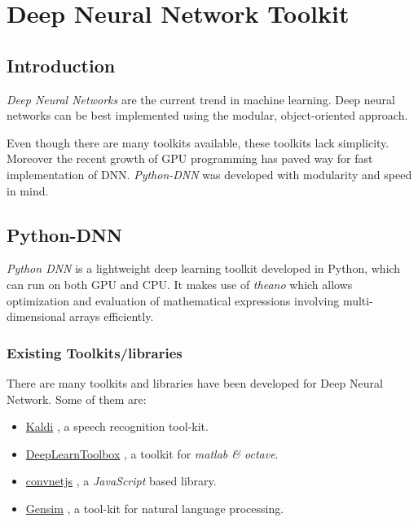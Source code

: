 \chapter{Deep Neural Network Toolkit} 
\label{chap:toolkit}
\section{Introduction}
\textit{Deep Neural Networks} are the current trend in machine learning.  Deep neural networks can be best implemented using the modular, object-oriented approach. 

Even though there are many toolkits available, these toolkits lack simplicity.  Moreover the recent growth of GPU programming has paved way for fast implementation of DNN. \textit{Python-DNN} was developed with modularity and speed in mind.

\section{Python-DNN}
\textit{Python DNN} is a lightweight deep learning toolkit developed in Python, which can run on both GPU and CPU.  It makes use of \emph{theano}  \cite{bergstra2010theano} which allows optimization and evaluation of mathematical expressions involving multi-dimensional arrays efficiently.

\subsection{Existing Toolkits/libraries}
There are many toolkits and libraries have been developed for Deep Neural Network.  Some of them are: 
\begin{itemize}
\item \href{http://kaldi.sourceforge.net/}{Kaldi} \citep{Povey_ASRU2011}, a speech recognition tool-kit.
\item \href{https://github.com/rasmusbergpalm/DeepLearnToolbox}{DeepLearnToolbox} \citep{IMM2012-06284}, a toolkit for \textit{matlab \& octave}.
\item \href{http://cs.stanford.edu/people/karpathy/convnetjs/}{convnetjs} \citep{convnetjs} , a \textit{JavaScript}  based library.
\item \href{https://radimrehurek.com/gensim}{Gensim} \citep{rehurek_lrec}, a tool-kit for natural language processing.
\end{itemize}

